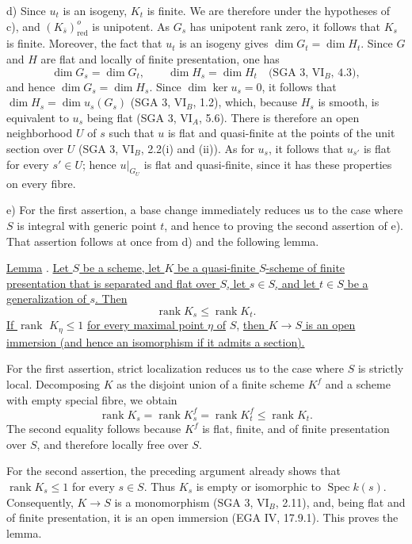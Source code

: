 \smallskip
\noindent
d) Since $u_t$ is an isogeny, $K_t$ is finite.  We are therefore under the
hypotheses of c), and $(K_{\bar s})^o_{\mathrm{red}}$ is unipotent.  As
$G_s$ has unipotent rank zero, it follows that $K_s$ is finite.  Moreover,
the fact that $u_t$ is an isogeny gives
$\dim G_t=\dim H_t$.  Since $G$ and $H$ are flat and locally of finite
presentation, one has
\[
 \dim G_s=\dim G_t,\qquad \dim H_s=\dim H_t
 \quad\text{(SGA 3, VI$_B$, 4.3)},
\]
and hence $\dim G_s=\dim H_s$.  Since $\dim\ker u_s=0$, it follows that
$\dim H_s=\dim u_s(G_s)$ (SGA 3, VI$_B$, 1.2), which, because $H_s$ is
smooth, is equivalent to $u_s$ being flat (SGA 3, VI$_A$, 5.6).  There is
therefore an open neighborhood $U$ of $s$ such that $u$ is flat and
quasi-finite at the points of the unit section over $U$ (SGA 3, VI$_B$,
2.2(i) and (ii)).  As for $u_s$, it follows that $u_{s'}$ is flat for
every $s'\in U$; hence $u|_{G_U}$ is flat and quasi-finite, since it has
these properties on every fibre.

\smallskip
\noindent
e) For the first assertion, a base change immediately reduces us to the
case where $S$ is integral with generic point $t$, and hence to proving the
second assertion of e).  That assertion follows at once from d) and the
following lemma.

\medskip
\noindent
\underline{Lemma} . \underline{Let $S$ be a scheme, let $K$ be a
quasi-finite $S$-scheme of finite presentation that is separated and flat
over $S$, let $s\in S$, and let $t\in S$ be a generalization of $s$.  Then}
\[
 \operatorname{rank}K_s\leq \operatorname{rank}K_t.
\]
\underline{If $\operatorname{rank}$} $K_\eta\leq1$ \underline{for every maximal point
$\eta$ of} $S$, \underline{then $K\longrightarrow S$ is an open immersion (and hence
an isomorphism if it admits a section).}

For the first assertion, strict localization reduces us to the case where
$S$ is strictly local.  Decomposing $K$ as the disjoint union of a finite
scheme $K^f$ and a scheme with empty special fibre, we obtain
\[
 \operatorname{rank}K_s
 =\operatorname{rank}K^f_s
 =\operatorname{rank}K^f_t
 \leq\operatorname{rank}K_t.
\]
The second equality follows because $K^f$ is flat, finite, and of finite
presentation over $S$, and therefore locally free over $S$.

For the second assertion, the preceding argument already shows that
$\operatorname{rank}K_s\leq1$ for every $s\in S$.  Thus $K_s$ is empty or
isomorphic to $\operatorname{Spec}k(s)$.  Consequently,
$K\longrightarrow S$ is a monomorphism (SGA 3, VI$_B$, 2.11), and, being
flat and of finite presentation, it is an open immersion (EGA IV, 17.9.1).
This proves the lemma.

